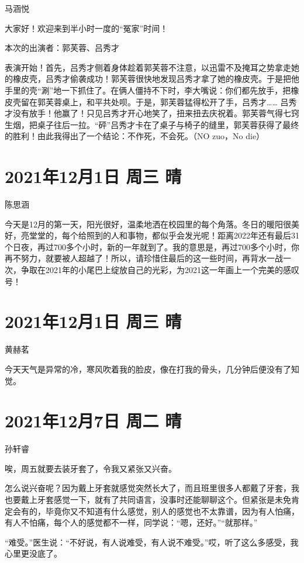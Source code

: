 马涵悦

大家好！欢迎来到半小时一度的“冤家”时间！

本次的出演者：郭芙蓉、吕秀才

表演开始！首先，吕秀才侧着身体趁着郭芙蓉不注意，以迅雷不及掩耳之势拿走她的橡皮壳，吕秀才偷袭成功！郭芙蓉很快地发现吕秀才拿了她的橡皮壳。于是把他手里的壳“涮”地一下抓住了。在俩人僵持不下时，李大嘴说：你们都先放手，把橡皮壳留在郭芙蓉桌上，和平共处呗。于是，郭芙蓉猛得松开了手，吕秀才…… 吕秀才没有放手！他赢了！只见吕秀才开心地笑了，扭来扭去庆祝着。郭芙蓉气得七窍生烟，把桌子往后一拉。“砰”吕秀才卡在了桌子与椅子的缝里，郭芙蓉获得了最终的胜利！由此我得出了一个结论：不作死，不会死。（NO
zuo，No die）

\section{2021年12月1日 周三 晴}

陈思涵

今天是12月的第一天，阳光很好，温柔地洒在校园里的每个角落。冬日的暖阳很美好，亮堂堂的，每个给照到的人和事物，都似乎会发光呢！距离2022年还有最后31个日夜，再过700多个小时，新的一年就到了。我的意思是，再过700多个小时，你再不努力，就要被人超越了！所以，请珍惜住最后的这一些时间，再背水一战一次，争取在2021年的小尾巴上绽放自己的光彩，为2021这一年画上一个完美的感叹号！

\section{2021年12月1日 周三 晴}

黄赫茗

今天天气是异常的冷，寒风吹着我的脸皮，像在打我的骨头，几分钟后便没有了知觉。

\section{2021年12月7日 周二 晴}

孙轩睿

唉，周五就要去装牙套了，令我又紧张又兴奋。

怎么说兴奋呢？因为戴上牙套就感觉突然长大了，而且班里很多人都戴了牙套，我也要戴上牙套感觉一下，就有了共同语言，没事时还能聊聊这个。但紧张是未免肯定会有的，毕竟你又不知道有什么感觉，别人的感觉也不太靠谱，因为有人怕痛，有人不怕痛，每个人的感觉都不一样，同学说：“嗯，还好。”“就那样。”

“难受。”医生说：“不好说，有人说难受，有人说不难受。”哎，听了这么多感受，我心里更没底了。

